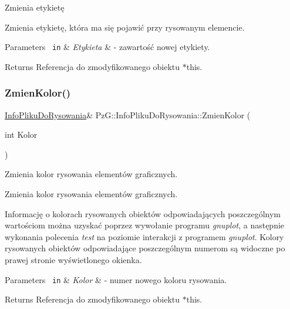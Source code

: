 Zmienia etykietę 

Zmienia etykietę, która ma się pojawić przy rysowanym elemencie. 
\begin{DoxyParams}[1]{Parameters}
\mbox{\texttt{ in}}  & {\em Etykieta} & -\/ zawartość nowej etykiety. \\
\hline
\end{DoxyParams}
\begin{DoxyReturn}{Returns}
Referencja do zmodyfikowanego obiektu $\ast$this. 
\end{DoxyReturn}
\mbox{\label{class_pz_g_1_1_info_pliku_do_rysowania_af5c256daaa945a31a1f137c9b429bc37}} 
\subsubsection{\texorpdfstring{ZmienKolor()}{ZmienKolor()}}
{\footnotesize\ttfamily \mbox{\hyperlink{class_pz_g_1_1_info_pliku_do_rysowania}{Info\+Pliku\+Do\+Rysowania}}\& Pz\+G\+::\+Info\+Pliku\+Do\+Rysowania\+::\+Zmien\+Kolor (\begin{DoxyParamCaption}\item[{int}]{Kolor }\end{DoxyParamCaption})\hspace{0.3cm}{\ttfamily [inline]}}



Zmienia kolor rysowania elementów graficznych. 

Zmienia kolor rysowania elementów graficznych.

Informację o kolorach rysowanych obiektów odpowiadających poszczególnym wartościom można uzyskać poprzez wywołanie programu {\itshape gnuplot}, a następnie wykonania polecenia {\itshape test} na poziomie interakcji z programem {\itshape gnuplot}. Kolory rysowanych obiektów odpowiadające poszczególnym numerom są widoczne po prawej stronie wyświetlonego okienka. 
\begin{DoxyParams}[1]{Parameters}
\mbox{\texttt{ in}}  & {\em Kolor} & -\/ numer nowego koloru rysowania. \\
\hline
\end{DoxyParams}
\begin{DoxyReturn}{Returns}
Referencja do zmodyfikowanego obiektu {\ttfamily $\ast$this}. 
\end{DoxyReturn}
\mbox{\label{class_pz_g_1_1_info_pliku_do_rysowania_ae734c69f5cecf9c0584e3a7f433340ea}} 
